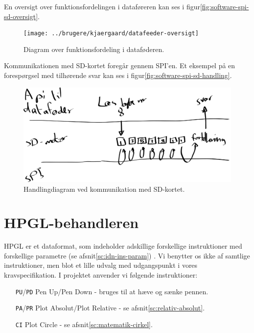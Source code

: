 En oversigt over funktionsfordelingen i
dataføreren kan ses i
figur\vref{fig:software-spi-sd-oversigt}.

\begin{figure}[htbp]
  \centering
  \texttt{[image: ../brugere/kjaergaard/datafeeder-oversigt]}
  \caption{Diagram over funktionsfordeling i dataføderen.}
  \label{fig:software-spi-sd-oversigt}
\end{figure}

Kommunikationen med SD-kortet foregår gennem SPI'en. Et eksempel på en forespørgsel med tilhørende svar
kan ses i figur\vref{fig:software-spi-sd-handling}.

\begin{figure}[htbp]
  \centering
  \includegraphics[width=\textwidth]{../brugere/kjaergaard/datafeeder-handling}
  \caption{Handlingdiagram ved kommunikation med SD-kortet.}
  \label{fig:software-spi-sd-handling}
\end{figure}


\section{HPGL-behandleren}

HPGL er et dataformat, som indeholder adskillige forskellige
instruktioner med forskellige parametre (se
afsnit\vref{sc:idn-ins-param}) . Vi benytter os ikke af samtlige
instruktioner, men blot et lille udvalg med udgangspunkt i vores
kravspecifikation.  I projektet anvender vi følgende instruktioner:

\begin{itemize} \firmlist
\item[\texttt{PU}/\texttt{PD}] Pen Up/Pen Down - bruges til at hæve og
  sænke pennen.
\item[\texttt{PA}/\texttt{PR}] Plot Absolut/Plot Relative - se
  afsnit\vref{sc:relativ-absolut}.
\item[\texttt{CI}] Plot Circle - se afsnit\vref{sc:matematik-cirkel}.
\end{itemize}

